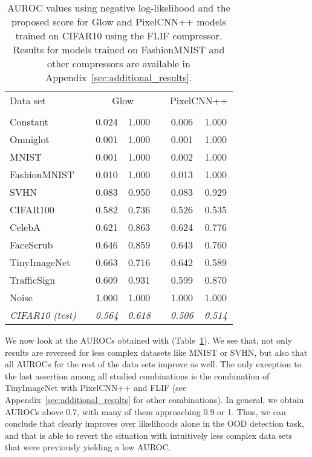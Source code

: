 \documentclass[letterpaper]{article} \usepackage{iclr2020_conference,times}
\begin{document}
\begin{table}[t]
\caption{AUROC values using negative log-likelihood  and the proposed score  for Glow and PixelCNN++ models trained on CIFAR10 using the FLIF compressor. Results for models trained on FashionMNIST and other compressors are available in Appendix~\ref{sec:additional_results}.}
\label{tab:compar_result}
\begin{center}
\begin{tabular}{lcccccc}
\hline
Data set        & & \multicolumn{2}{c}{Glow}    & & \multicolumn{2}{c}{PixelCNN++}  \\
\cline{3-4}\cline{6-7}
                & &    &        & &    &  \\
\hline
Constant        & & 0.024   & 1.000 & & 0.006   & 1.000 \\
Omniglot        & & 0.001   & 1.000 & & 0.001   & 1.000 \\
MNIST           & & 0.001   & 1.000 & & 0.002   & 1.000 \\
FashionMNIST    & & 0.010   & 1.000 & & 0.013   & 1.000 \\
SVHN            & & 0.083   & 0.950 & & 0.083   & 0.929 \\
CIFAR100        & & 0.582   & 0.736 & & 0.526   & 0.535 \\
CelebA          & & 0.621   & 0.863 & & 0.624   & 0.776 \\
FaceScrub       & & 0.646   & 0.859 & & 0.643   & 0.760 \\
TinyImageNet    & & 0.663   & 0.716 & & 0.642   & 0.589 \\
TrafficSign     & & 0.609   & 0.931 & & 0.599   & 0.870 \\
Noise           & & 1.000   & 1.000 & & 1.000   & 1.000 \\
\hline
\textit{CIFAR10 (test)} & & \textit{0.564}   & \textit{0.618} & & \textit{0.506}   & \textit{0.514} \\
\hline
\end{tabular}
\end{center}
\end{table}

We now look at the AUROCs obtained with  (Table~\ref{tab:compar_result}). We see that, not only results are reversed for less complex datasets like MNIST or SVHN, but also that all AUROCs for the rest of the data sets improve as well. The only exception to the last assertion among all studied combinations is the combination of TinyImageNet with PixelCNN++ and FLIF (see Appendix~\ref{sec:additional_results} for other combinations). In general, we obtain AUROCs above 0.7, with many of them approaching 0.9 or 1. Thus, we can conclude that  clearly improves over likelihoods alone in the OOD detection task, and that  is able to revert the situation with intuitively less complex data sets that were previously yielding a low AUROC.
\end{document}
